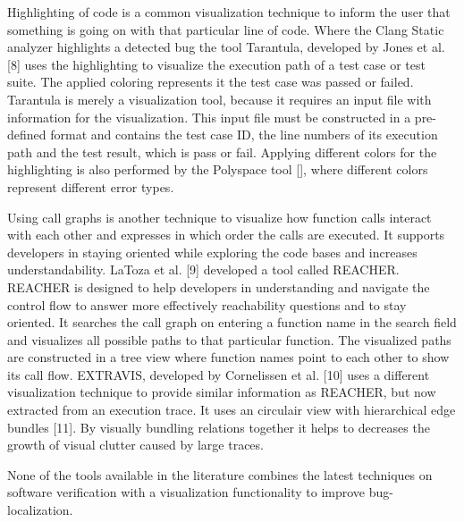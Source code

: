 Highlighting of code is a common visualization technique to inform the user that something is going on with that particular line of code. Where the Clang Static analyzer highlights a detected bug the tool Tarantula, developed by Jones et al. [8] uses the highlighting to visualize the execution path of a test case or test suite. The applied coloring represents it the test case was passed or failed. Tarantula is merely a visualization tool, because it requires an input file with information for the visualization. This input file must be constructed in a pre-defined format and contains the test case ID, the line numbers of its execution path and the test result, which is pass or fail. Applying different colors for the highlighting is also performed by the Polyspace tool [], where different colors represent different error types. 

Using call graphs is another technique to visualize how function calls interact with each other and expresses in which order the calls are executed. It supports developers in staying oriented while exploring the code bases and increases understandability. LaToza et al. [9] developed a tool called REACHER. REACHER is designed to help developers in understanding and navigate the control flow to answer more effectively reachability questions and to stay oriented. It searches the call graph on entering a function name in the search field and visualizes all possible paths to that particular function. The visualized paths are constructed in a tree view where function names point to each other to show its call flow. EXTRAVIS, developed by Cornelissen et al. [10] uses a different visualization technique to provide similar information as REACHER, but now extracted from an execution trace. It uses an circulair view with hierarchical edge bundles [11]. By visually bundling relations together it helps to decreases the growth of visual clutter caused by large traces.

None of the tools available in the literature combines the latest techniques on software verification with a visualization functionality to improve bug-localization.

